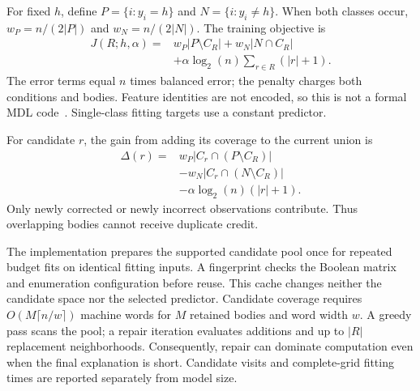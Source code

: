 \documentclass[a4paper,fleqn,review]{cas-sc}
\begin{document}
For fixed $h$, define $P=\{i:y_i=h\}$ and $N=\{i:y_i\ne h\}$. When both classes occur, $w_P=n/(2|P|)$ and $w_N=n/(2|N|)$. The training objective is
\begin{equation}\label{eq:objective}
 \begin{aligned}
 J(R;h,\alpha)={}&w_P|P\setminus C_R|+w_N|N\cap C_R|\\
    &+\alpha\log_2(n)\sum_{r\in R}(|r|+1).
 \end{aligned}
\end{equation}
The error terms equal $n$ times balanced error; the penalty charges both conditions and bodies. Feature identities are not encoded, so this is not a formal MDL code~\citep{rissanen1978}. Single-class fitting targets use a constant predictor.

For candidate $r$, the gain from adding its coverage to the current union is
\begin{equation}\label{eq:gain}
 \begin{aligned}
 \Delta(r)={}&w_P|C_r\cap(P\setminus C_R)|\\
 &-w_N|C_r\cap(N\setminus C_R)|\\
 &-\alpha\log_2(n)(|r|+1).
 \end{aligned}
\end{equation}
Only newly corrected or newly incorrect observations contribute. Thus overlapping bodies cannot receive duplicate credit.

The implementation prepares the supported candidate pool once for repeated budget fits on identical fitting inputs. A fingerprint checks the Boolean matrix and enumeration configuration before reuse. This cache changes neither the candidate space nor the selected predictor. Candidate coverage requires $O(M\lceil n/w\rceil)$ machine words for $M$ retained bodies and word width $w$. A greedy pass scans the pool; a repair iteration evaluates additions and up to $|R|$ replacement neighborhoods. Consequently, repair can dominate computation even when the final explanation is short. Candidate visits and complete-grid fitting times are reported separately from model size.
\end{document}
